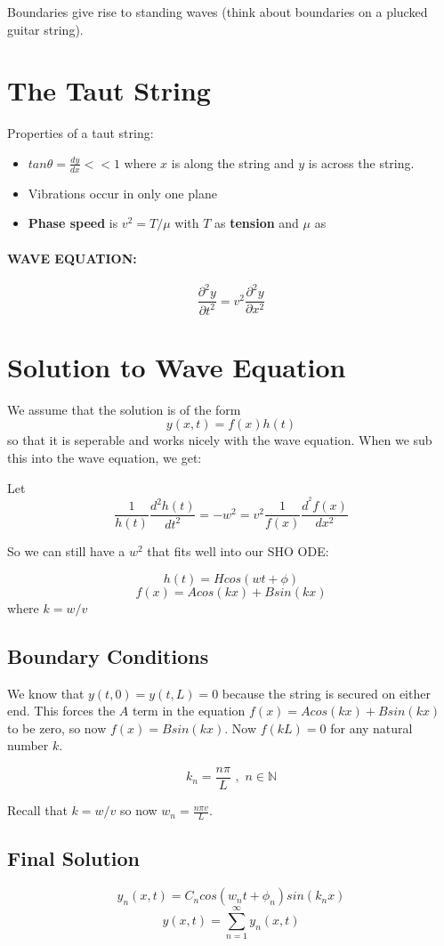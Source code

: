 \documentclass[a4paper,12pt]{report}
\begin{document}
Boundaries give rise to standing waves (think about boundaries on a plucked guitar string).

\section{The Taut String}
Properties of a taut string:
\begin{itemize}
\item $tan\theta = \frac{dy}{dx} << 1$ where $x$ is along the string and $y$ is across the string.
\item Vibrations occur in only one plane
\item \textbf{Phase speed } is $v^2 = T/\mu$ with $T$ as \textbf{tension} and $\mu$ as 
\end{itemize}

\paragraph{WAVE EQUATION: } $$\frac{\partial^2 y}{\partial t^2} = v^2 \frac{\partial^2y}{\partial x^2}$$

\section{Solution to Wave Equation}
We assume that the solution is of the form $$y(x, t) = f(x)h(t)$$ so that it is seperable and works nicely 
with the wave equation. When we sub this into the wave equation, we get:

Let $$\frac{1}{h(t)} \frac{d^2h(t)}{dt^2} = -w^2 = v^2 \frac{1}{f(x)} \frac{d^^2f(x)}{dx^2}$$

So we can still have a $w^2$ that fits well into our SHO ODE:

$$h(t) = H cos(wt + \phi)$$ $$f(x) = A cos(kx) + B sin(kx)$$ where $k = w/v$

\subsection{Boundary Conditions}
We know that $y(t, 0) = y(t, L) = 0$ because the string is secured on either end. This forces the $A$ term 
in the equation $f(x) = A cos(kx) + B sin(kx)$ to be zero, so now $f(x) = B sin(kx)$. Now $f(kL) = 0$ for 
any natural number $k$. 

$$k_n = \frac{n \pi}{L} \,\,, \,\, n \in \mathbb{N}$$

Recall that $k = w/v$ so now $w_n = \frac{n \pi v}{L}$. 

\subsection{Final Solution}
$$y_n(x, t) = C_n cos(w_n t + \phi_n)sin(k_n x)$$
$$y(x, t) = \sum_{n=1}^{\infty} y_n(x, t)$$
\end{document}
